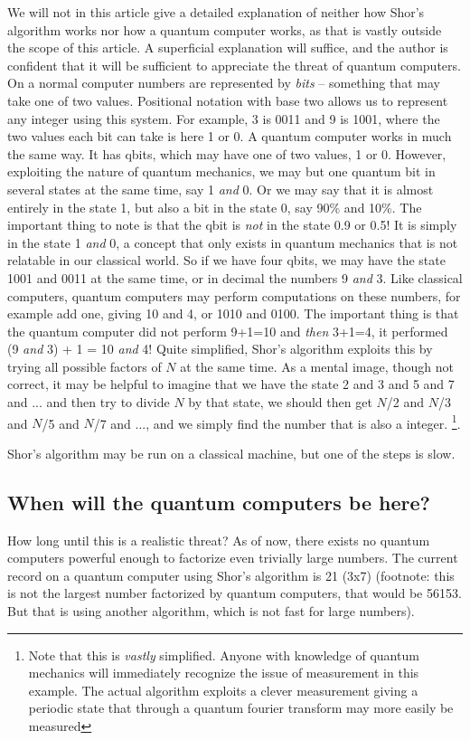 \documentclass[conference]{IEEEtran}
\begin{document}
We will not in this article give a detailed explanation of neither how Shor's algorithm works nor how a quantum computer works, as that is vastly outside the scope of this article.
A superficial explanation will suffice, and the author is confident that it will be sufficient to appreciate the threat of quantum computers.
On a normal computer numbers are represented by \emph{bits} -- something that may take one of two values.
Positional notation with base two allows us to represent any integer using this system.
For example, 3 is 0011 and 9 is 1001, where the two values each bit can take is here 1 or 0.
A quantum computer works in much the same way.
It has qbits, which may have one of two values, 1 or 0.
However, exploiting the nature of quantum mechanics, we may but one quantum bit in several states at the same time, say 1 \emph{and} 0.
Or we may say that it is almost entirely in the state 1, but also a bit in the state 0, say 90\% and 10\%.
The important thing to note is that the qbit is \emph{not} in the state 0.9 or 0.5!
It is simply in the state 1 \emph{and} 0, a concept that only exists in quantum mechanics that is not relatable in our classical world.
So if we have four qbits, we may have the state 1001 and 0011 at the same time, or in decimal the numbers 9 \emph{and} 3.
Like classical computers, quantum computers may perform computations on these numbers, for example add one, giving 10 and 4, or 1010 and 0100.
The important thing is that the quantum computer did not perform 9+1=10 and \emph{then} 3+1=4, it performed (9 \emph{and} 3) + 1 = 10 \emph{and} 4!
Quite simplified, Shor's algorithm exploits this by trying all possible factors of $N$ at the same time.
As a mental image, though not correct, it may be helpful to imagine that we have the state 2 and 3 and 5 and 7 and ... and then try to divide $N$ by that state, we should then get $N$/2 and $N$/3 and $N$/5 and $N$/7 and ..., and we simply find the number that is also a integer. \footnote{Note that this is \emph{vastly} simplified. Anyone with knowledge of quantum mechanics will immediately recognize the issue of measurement in this example. The actual algorithm exploits a clever measurement giving a periodic state that through a quantum fourier transform may more easily be measured}.

Shor's algorithm may be run on a classical machine, but one of the steps is slow.


\subsection{When will the quantum computers be here?}
How long until this is a realistic threat?
As of now, there exists no quantum computers powerful enough to factorize even trivially large numbers.
The current record on a quantum computer using Shor's algorithm is 21 (3x7) (footnote: this is not the largest number factorized by quantum computers, that would be 56153. But that is using another algorithm, which is not fast for large numbers).
\end{document}
